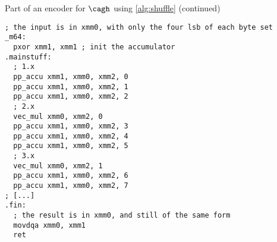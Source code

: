 {\small
\begin{listing}[!htb]
\begin{center}
\caption{Part of an encoder for $\cagh$ using \autoref{alg:shuffle} (continued)}
\begin{verbatim}
; the input is in xmm0, with only the four lsb of each byte set
_m64:
  pxor xmm1, xmm1 ; init the accumulator
.mainstuff:
  ; 1.x
  pp_accu xmm1, xmm0, xmm2, 0
  pp_accu xmm1, xmm0, xmm2, 1
  pp_accu xmm1, xmm0, xmm2, 2
  ; 2.x
  vec_mul xmm0, xmm2, 0
  pp_accu xmm1, xmm0, xmm2, 3
  pp_accu xmm1, xmm0, xmm2, 4
  pp_accu xmm1, xmm0, xmm2, 5
  ; 3.x
  vec_mul xmm0, xmm2, 1
  pp_accu xmm1, xmm0, xmm2, 6
  pp_accu xmm1, xmm0, xmm2, 7
; [...]
.fin:
  ; the result is in xmm0, and still of the same form
  movdqa xmm0, xmm1
  ret
\end{verbatim}
\end{center}
\end{listing}
}

\renewcommand\thesection{\arabic{section}}
